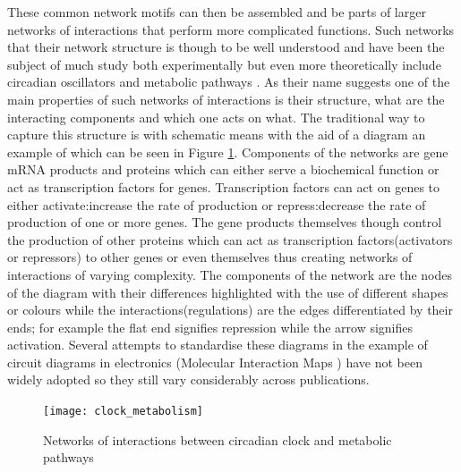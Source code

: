 These common network motifs can then be assembled and be parts of larger networks of interactions that perform more complicated functions.  Such networks that their network structure is though to be well understood and have been the subject of much study both experimentally but even more theoretically include circadian oscillators and metabolic pathways \cite[] {bass2010circadian, sahar2012regulation, mirsky2009model}. As their name suggests one of the main properties of such networks of interactions is their structure, what are the interacting components and which one acts on what. The traditional way to capture this structure is with schematic means with the aid of a diagram an example of which can be seen in Figure \ref{fig:diagram_example}. Components of the networks are gene mRNA products and proteins which can either serve a biochemical function or act as transcription factors for genes. Transcription factors can act on genes to either activate:increase the rate of production or repress:decrease the rate of production of one or more genes. The gene products themselves though control the production of other proteins which can act as transcription factors(activators or repressors) to other genes or even themselves thus creating networks of interactions of varying complexity. The components of the network are the nodes of the diagram with their differences highlighted with the use of different shapes or colours while the interactions(regulations) are the edges differentiated by their ends; for example the flat end signifies repression while the arrow signifies activation. Several attempts to standardise these diagrams in the example of circuit diagrams in electronics (Molecular Interaction Maps \cite[] {kohn2006molecular}) have not been widely adopted so they still vary considerably across publications.
\begin{figure}
\centering
\texttt{[image: clock\_metabolism]}
\caption{Networks of interactions between circadian clock and metabolic pathways \cite[] {sahar2012regulation}}

\label{fig:diagram_example}
\end{figure}

